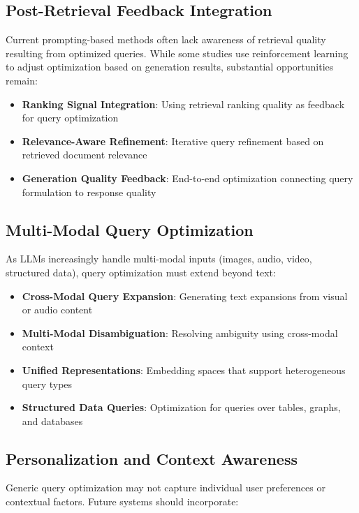 \documentclass{article}
\begin{document}
\subsection{Post-Retrieval Feedback Integration}

Current prompting-based methods often lack awareness of retrieval quality resulting from optimized queries. While some studies use reinforcement learning to adjust optimization based on generation results, substantial opportunities remain:

\begin{itemize}[leftmargin=*,nosep]
    \item \textbf{Ranking Signal Integration}: Using retrieval ranking quality as feedback for query optimization
    \item \textbf{Relevance-Aware Refinement}: Iterative query refinement based on retrieved document relevance
    \item \textbf{Generation Quality Feedback}: End-to-end optimization connecting query formulation to response quality
\end{itemize}

\subsection{Multi-Modal Query Optimization}

As LLMs increasingly handle multi-modal inputs (images, audio, video, structured data), query optimization must extend beyond text:

\begin{itemize}[leftmargin=*,nosep]
    \item \textbf{Cross-Modal Query Expansion}: Generating text expansions from visual or audio content
    \item \textbf{Multi-Modal Disambiguation}: Resolving ambiguity using cross-modal context
    \item \textbf{Unified Representations}: Embedding spaces that support heterogeneous query types
    \item \textbf{Structured Data Queries}: Optimization for queries over tables, graphs, and databases
\end{itemize}

\subsection{Personalization and Context Awareness}

Generic query optimization may not capture individual user preferences or contextual factors. Future systems should incorporate:
\end{document}

